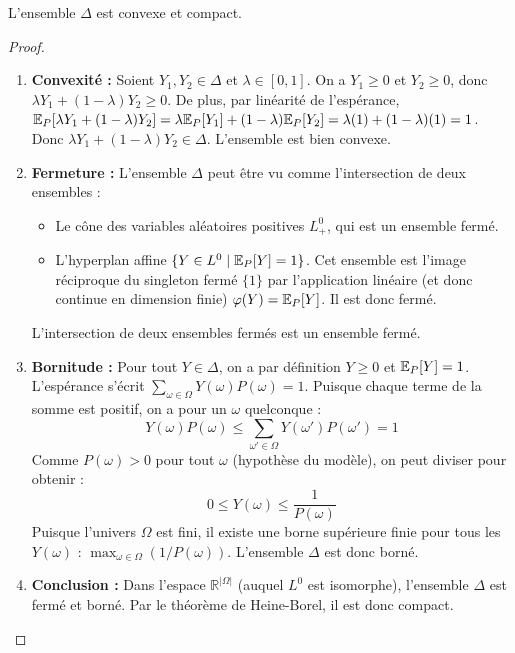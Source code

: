 \begin{lemme}
L'ensemble $\Delta$ est convexe et compact.
\end{lemme}

\begin{proof}
\begin{enumerate}
    \item \textbf{Convexité :} Soient $Y_1, Y_2 \in \Delta$ et $\lambda \in [0,1]$. On a $Y_1 \ge 0$ et $Y_2 \ge 0$, donc $\lambda Y_1 + (1-\lambda)Y_2 \ge 0$. De plus, par linéarité de l'espérance, $\mathbb{E}_P[\lambda Y_1 + (1-\lambda)Y_2] = \lambda \mathbb{E}_P[Y_1] + (1-\lambda)\mathbb{E}_P[Y_2] = \lambda(1) + (1-\lambda)(1) = 1$. Donc $\lambda Y_1 + (1-\lambda)Y_2 \in \Delta$. L'ensemble est bien convexe.
    \item \textbf{Fermeture :} L'ensemble $\Delta$ peut être vu comme l'intersection de deux ensembles :
    \begin{itemize}
        \item Le cône des variables aléatoires positives $L^0_+$, qui est un ensemble fermé.
        \item L'hyperplan affine $\{Y \in L^0 \mid \mathbb{E}_P[Y] = 1\}$. Cet ensemble est l'image réciproque du singleton fermé $\{1\}$ par l'application linéaire (et donc continue en dimension finie) $\varphi(Y) = \mathbb{E}_P[Y]$. Il est donc fermé.
    \end{itemize}
    L'intersection de deux ensembles fermés est un ensemble fermé.
    \item \textbf{Bornitude :} Pour tout $Y \in \Delta$, on a par définition $Y \ge 0$ et $\mathbb{E}_P[Y] = 1$. L'espérance s'écrit $\sum_{\omega \in \Omega} Y(\omega)P(\omega) = 1$. Puisque chaque terme de la somme est positif, on a pour un $\omega$ quelconque :
    \[
    Y(\omega)P(\omega) \le \sum_{\omega' \in \Omega} Y(\omega')P(\omega') = 1
    \]
    Comme $P(\omega) > 0$ pour tout $\omega$ (hypothèse du modèle), on peut diviser pour obtenir :
    \[
    0 \le Y(\omega) \le \frac{1}{P(\omega)}
    \]
    Puisque l'univers $\Omega$ est fini, il existe une borne supérieure finie pour tous les $Y(\omega)$ : $\max_{\omega \in \Omega} (1 / P(\omega))$. L'ensemble $\Delta$ est donc borné.
    \item \textbf{Conclusion :} Dans l'espace $\mathbb{R}^{|\Omega|}$ (auquel $L^0$ est isomorphe), l'ensemble $\Delta$ est fermé et borné. Par le théorème de Heine-Borel, il est donc compact.
\end{enumerate}
\end{proof}

